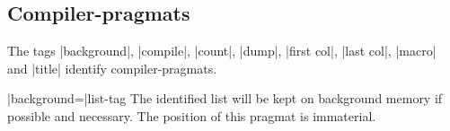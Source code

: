 \documentclass{article}
\newcommand\g[1]{{\sf #1}}
\newenvironment{witemize}{\begin{list}{}{%
\advance\leftmargin by 16pt%
\setlength\itemsep{0ex plus 0.2ex}%
\setlength\partopsep{3pt}%
\setlength\topsep{2pt plus 2pt}%
\setlength\parsep{0pt plus 2pt}%
}}{\end{list}}
\begin{document}
%
\subsection{Compiler-pragmats}\label{6.1}

The \g{tag}s \pp|background|, \pp|compile|,
\pp|count|, \pp|dump|, \pp|first col|, \pp|last col|, \pp|macro| and
\pp|title| identify compiler-pragmats.

\X\pp|background=|\g{list-tag}\Y
The identified list will be kept on
background memory if possible and necessary. The position of this
\g{pragmat} is immaterial.

%
\end{document}

